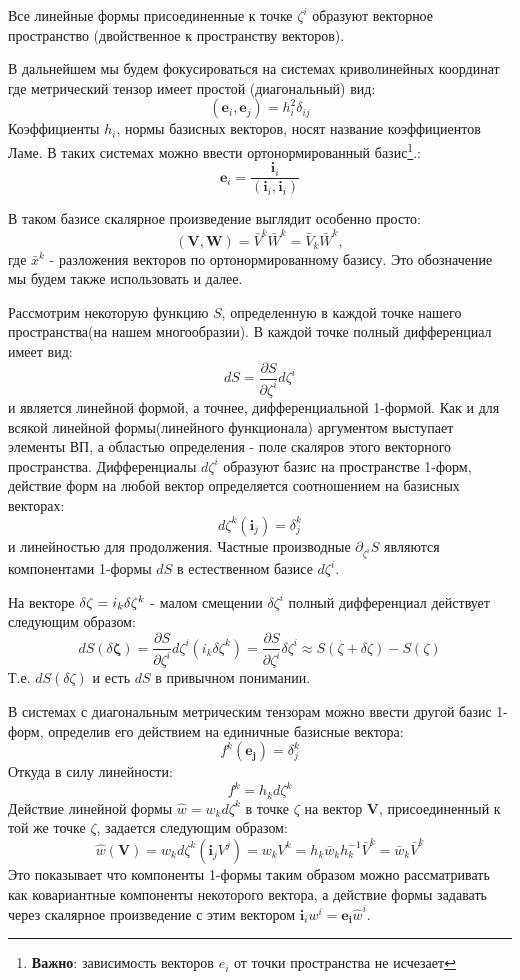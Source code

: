 \documentclass{article}
\begin{document}
Все линейные формы присоединенные к точке $\zeta^i$ образуют векторное пространство (двойственное к пространству векторов).   

В дальнейшем мы будем фокусироваться на системах криволинейных координат где метрический тензор имеет простой (диагональный) вид:
$$(\mathbf{e}_i, \mathbf{e}_j) = h^2_i \delta_{ij}$$ 
Коэффициенты $h_i$, нормы базисных векторов, носят название коэффициентов Ламе.
В таких системах можно ввести ортонормированный базис\footnote{\textbf{Важно}: зависимость векторов $e_i$ от точки пространства не исчезает}.:
$$ \mathbf{e}_i = \frac{\mathbf{i}_i}{(\mathbf{i}_i,\mathbf{i}_i)}$$


В таком базисе скалярное произведение выглядит особенно просто:
$$(\mathbf{V}, \mathbf{W}) = \bar{V}^k \bar{W}^k = \bar{V}_k \bar {W}^k,$$
где $\bar{x}^k$ - разложения векторов по ортонормированному базису. Это обозначение мы будем также использовать и далее.

Рассмотрим некоторую функцию $S$, определенную в каждой точке нашего пространства(на нашем многообразии). В каждой точке полный дифференциал имеет вид:
$$dS = \frac {\partial S}{\partial \zeta^i} d \zeta^i$$
и является линейной формой, а точнее, дифференциальной 1-формой. Как и для всякой линейной формы(линейного функционала) аргументом выступает элементы ВП, а областью определения - поле скаляров этого векторного пространства.
Дифференциалы $d \zeta^i$ образуют базис на пространстве 1-форм, действие форм на любой вектор определяется соотношением на базисных векторах:
$$d \zeta^k (\mathbf{i}_j) = \delta^k_j$$ 
и линейностью для продолжения. Частные производные $ \partial_{\zeta^i} S$ являются компонентами 1-формы $dS$ в естественном базисе $d \zeta^i$.

На векторе $\delta \boldmath{\zeta}= i_k \delta \zeta^k$ - малом смещении $\delta \zeta^i$ полный дифференциал действует следующим образом:
$$dS (\delta \mathbf{\zeta}) = \frac {\partial S}{\partial \zeta^i} d \zeta^i (i_k \delta \zeta^k) = \frac {\partial S}{\partial \zeta^i} \delta \zeta^i \approx S(\zeta + \delta\zeta) - S(\zeta)$$
Т.е. $dS(\delta \zeta)$ и есть $dS$ в привычном понимании.

В системах с диагональным метрическим тензорам можно ввести другой базис 1-форм, определив его действием на единичные базисные вектора:
$$f^k (\mathbf{e_j}) = \delta^k_j$$
Откуда в силу линейности:
$$f^k = h_k d \zeta^k$$ 
Действие линейной формы $\hat{w} = w_k d \zeta^k$ в точке $\zeta$ на вектор $\mathbf{V}$, присоединенный к той же точке $\zeta$, задается следующим образом:
$$ \hat{w} (\mathbf{V}) = w_k d \zeta^k (\mathbf{i}_j V^j) = w_k V^k = h_k \bar{w}_k h^{-1}_k \bar{V}^k= \bar{w}_k \bar{V}^k $$
Это показывает что компоненты 1-формы таким образом можно рассматривать как ковариантные компоненты некоторого вектора, а действие формы задавать через скалярное произведение с этим вектором $\mathbf i_i w^i = \mathbf{e_i} \hat{w}^i$.
\end{document}

